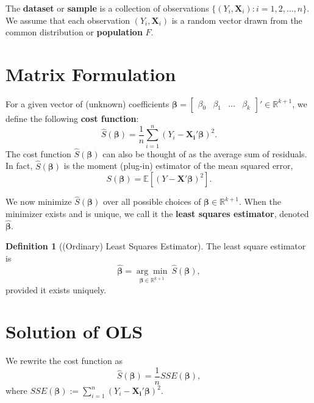 \documentclass[
]{book}
\theoremstyle{definition}
\newtheorem{definition}{Definition}[chapter]
\theoremstyle{definition}
\theoremstyle{definition}
\theoremstyle{definition}
\theoremstyle{remark}
\begin{document}
The \textbf{dataset} or \textbf{sample} is a collection of observations \(\{(Y_i,\pmb{X}_i): i=1,2,\ldots,n\}\). We assume that each observation
\((Y_i,\pmb{X}_i)\) is a random vector drawn from the common distribution or \textbf{population} \(F\).

\hypertarget{matrix-formulation}{%
\section{Matrix Formulation}\label{matrix-formulation}}

For a given vector of (unknown) coefficients
\(\pmb{\beta}=\begin{bmatrix}\beta_0 & \beta_1 & \ldots & \beta_k\end{bmatrix}'\in\mathbb{R}^{k+1}\), we define the following \textbf{cost function}:
\[
\widehat{S}(\pmb{\beta})=\frac{1}{n}\sum\limits_{i=1}^n(Y_i-\pmb{X_i}'\pmb{\beta})^2.
\]
The cost function \(\widehat{S}({\pmb{\beta}})\) can also be thought of as the average sum of residuals. In fact, \(\widehat{S}({\pmb{\beta}})\) is the moment (plug-in) estimator of the mean squared error,
\[
S(\pmb{\beta})={\mathbb{E}\left[ (Y-\pmb{X}'\pmb{\beta})^2 \right]}.
\]

We now minimize \(\widehat{S}({\pmb{\beta}})\) over all possible choices of
\(\pmb{\beta}\in\mathbb{R}^{k+1}\). When the minimizer exists and is unique, we call it the \textbf{least squares estimator}, denoted \(\widehat{\pmb{\beta}}\).

\begin{definition}[(Ordinary) Least Squares Estimator]
The least square estimator is \[
\widehat{\pmb{\beta}}
=\underset{\pmb{\beta}\in\mathbb{R}^{k+1}}{\arg\min} \ \widehat{S}(\pmb{\beta}),
\]
provided it exists uniquely.
\end{definition}

\hypertarget{solution-of-ols}{%
\section{Solution of OLS}\label{solution-of-ols}}

We rewrite the cost function as
\[
\widehat{S}(\pmb{\beta})=\frac{1}{n}SSE(\pmb{\beta}),
\]
where
\(SSE(\pmb{\beta}):=\sum\limits_{i=1}^n(Y_i-\pmb{X_i}'\pmb{\beta})^2\).
\end{document}
